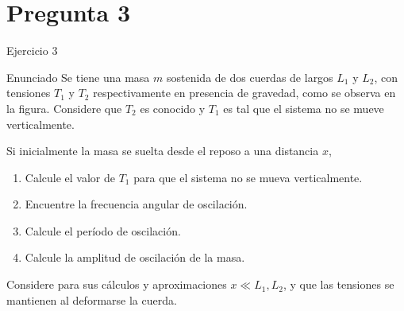 \documentclass[
    10pt,
    aspectratio=169,
    xcolor={dvipsnames},
    spanish,
    ]{beamer}
\begin{document}
\section{Pregunta 3}
\begin{frame}{Ejercicio 3}
  \footnotesize
  \begin{block}{Enunciado}
    Se tiene una masa $m$ sostenida de dos cuerdas de largos $L_1$ y $L_2$, con tensiones $T_1$ y $T_2$ respectivamente en presencia de gravedad, como se observa en la figura. Considere que $T_2$ es conocido y $T_1$ es tal que el sistema no se mueve verticalmente.

Si inicialmente la masa se suelta desde el reposo a una distancia $x$,
\begin{enumerate}
  \item Calcule el valor de $T_1$ para que el sistema no se mueva verticalmente.
  \item Encuentre la frecuencia angular de oscilación.
  \item Calcule el período de oscilación.
  \item Calcule la amplitud de oscilación de la masa.
\end{enumerate}
Considere para sus cálculos y aproximaciones $x \ll L_1, L_2$, y que las tensiones se mantienen al deformarse la cuerda.
\begin{figure}
\centering
\end{figure}
\end{block}
\end{frame}
\end{document}
